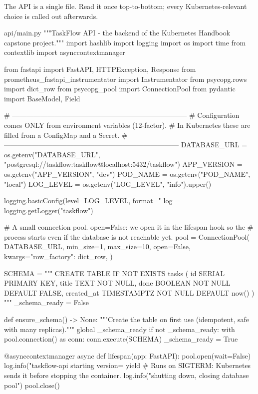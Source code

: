 The API is a single file. Read it once top-to-bottom; every Kubernetes-relevant
choice is called out afterwards.

\begin{pycode}{api/main.py}
"""TaskFlow API - the backend of the Kubernetes Handbook capstone project."""
import hashlib
import logging
import os
import time
from contextlib import asynccontextmanager

from fastapi import FastAPI, HTTPException, Response
from prometheus_fastapi_instrumentator import Instrumentator
from psycopg.rows import dict_row
from psycopg_pool import ConnectionPool
from pydantic import BaseModel, Field

# ---------------------------------------------------------------------------
# Configuration comes ONLY from environment variables (12-factor).
# In Kubernetes these are filled from a ConfigMap and a Secret.
# ---------------------------------------------------------------------------
DATABASE_URL = os.getenv("DATABASE_URL", "postgresql://taskflow:taskflow@localhost:5432/taskflow")
APP_VERSION = os.getenv("APP_VERSION", "dev")
POD_NAME = os.getenv("POD_NAME", "local")
LOG_LEVEL = os.getenv("LOG_LEVEL", "info").upper()

logging.basicConfig(level=LOG_LEVEL, format="%
log = logging.getLogger("taskflow")

# A small connection pool. open=False: we open it in the lifespan hook so the
# process starts even if the database is not reachable yet.
pool = ConnectionPool(
    DATABASE_URL, min_size=1, max_size=10, open=False,
    kwargs={"row_factory": dict_row},
)

SCHEMA = """
CREATE TABLE IF NOT EXISTS tasks (
    id         SERIAL PRIMARY KEY,
    title      TEXT        NOT NULL,
    done       BOOLEAN     NOT NULL DEFAULT FALSE,
    created_at TIMESTAMPTZ NOT NULL DEFAULT now()
)
"""
_schema_ready = False


def ensure_schema() -> None:
    """Create the table on first use (idempotent, safe with many replicas)."""
    global _schema_ready
    if not _schema_ready:
        with pool.connection() as conn:
            conn.execute(SCHEMA)
        _schema_ready = True


@asynccontextmanager
async def lifespan(app: FastAPI):
    pool.open(wait=False)
    log.info("taskflow-api starting version=%
    yield
    # Runs on SIGTERM: Kubernetes sends it before stopping the container.
    log.info("shutting down, closing database pool")
    pool.close()



\end{pycode}
